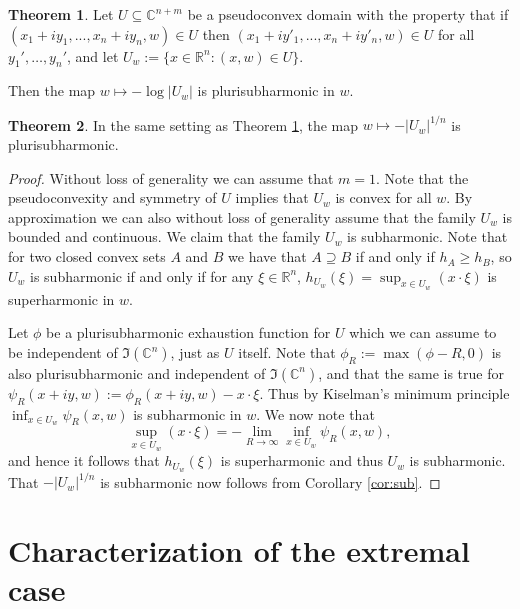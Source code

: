\documentclass[reqno]{amsart}
\theoremstyle{definition}
\newtheorem{theorem}{Theorem}[section]
\theoremstyle{definition}
\theoremstyle{definition}
\begin{document}
\begin{theorem}\label{thm:B}
Let $U\subseteq \mathbb{C}^{n+m}$ be a pseudoconvex domain with the property that if $(x_1+iy_1,...,x_n+iy_n,w)\in U$ then $(x_1+iy'_1,...,x_n+iy'_n,w)\in U$ for all $y_1',\ldots,y_n'$, and let $U_w:=\{x\in \mathbb{R}^n: (x,w)\in U\}$. 

Then the map $w\mapsto -\log|U_w|$ is plurisubharmonic in $w$.
\end{theorem}


\begin{theorem}
In the same setting as Theorem \ref{thm:B}, the map $w\mapsto -|U_w|^{1/n}$ is plurisubharmonic.
\end{theorem}

\begin{proof}
    Without loss of generality we can assume that $m=1$. Note that the pseudoconvexity and symmetry of $U$ implies that $U_w$ is convex for all $w$. By approximation we can also without loss of generality assume that the family $U_w$ is bounded and continuous. We claim that the family $U_w$ is subharmonic. Note that for two closed convex sets $A$ and $B$ we have that $A\supseteq B$ if and only if $h_A\geq h_B$, so $U_w$ is subharmonic if and only if for any $\xi\in \mathbb{R}^n$, $h_{U_w}(\xi)=\sup_{x\in U_w}(x\cdot \xi)$ is superharmonic in $w$. 
    
    Let $\phi$ be a plurisubharmonic exhaustion function for $U$ which we can assume to be independent of $\Im(\mathbb{C}^n)$, just as $U$ itself. Note that $\phi_R:=\max(\phi-R,0)$  is also plurisubharmonic and independent of $\Im(\mathbb{C}^n)$, and that the same is true for $\psi_R(x+iy,w):=\phi_R(x+iy,w)-x\cdot \xi$. Thus by Kiselman's minimum principle $\inf_{x\in U_w}\psi_R(x,w)$ is subharmonic in $w$. We now note that $$\sup_{x\in U_w}(x\cdot \xi)=-\lim_{R\to\infty}\inf_{x\in U_w}\psi_R(x,w),$$ and hence it follows that $h_{U_w}(\xi)$ is superharmonic and thus $U_w$ is subharmonic. That $-|U_w|^{1/n}$ is subharmonic now follows from Corollary \ref{cor:sub}. 
\end{proof}



\section{Characterization of the extremal case}

%
\end{document}

